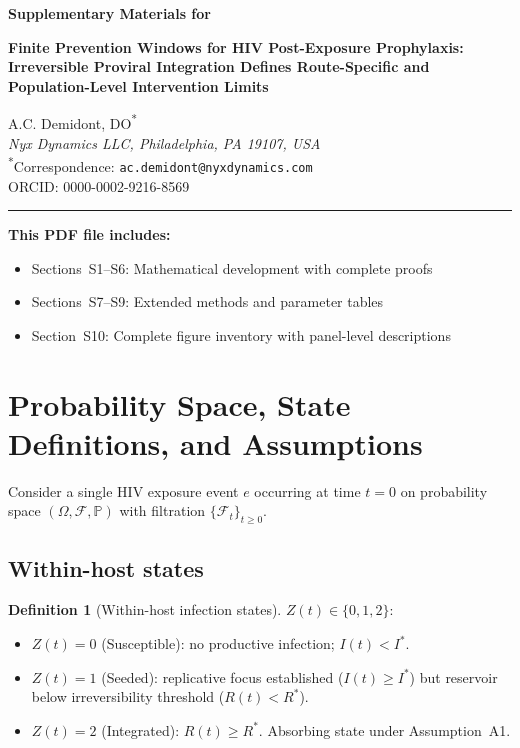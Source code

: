 \documentclass[11pt]{article}
\theoremstyle{definition}
\newtheorem{definition}{Definition}[section]
\theoremstyle{remark}
\begin{document}
\begin{flushleft}
{\Large\bfseries Supplementary Materials for\par}
\vspace{0.3em}
{\large\bfseries Finite Prevention Windows for HIV Post-Exposure Prophylaxis: Irreversible Proviral Integration Defines Route-Specific and Population-Level Intervention Limits\par}
\vspace{0.8em}
A.C. Demidont, DO\textsuperscript{*}\\
\textit{Nyx Dynamics LLC, Philadelphia, PA 19107, USA}\\
\textsuperscript{*}Correspondence: \texttt{ac.demidont@nyxdynamics.com}\\
ORCID: 0000-0002-9216-8569
\end{flushleft}

\vspace{0.5em}
\hrule
\vspace{0.5em}

\noindent\textbf{This PDF file includes:}
\begin{itemize}[leftmargin=2em,nosep]
    \item Sections~S1--S6: Mathematical development with complete proofs
    \item Sections~S7--S9: Extended methods and parameter tables
    \item Section~S10: Complete figure inventory with panel-level descriptions
\end{itemize}

\section{Probability Space, State Definitions, and Assumptions}

Consider a single HIV exposure event $e$ occurring at time $t = 0$ on probability space $(\Omega, \mathcal{F}, \mathbb{P})$ with filtration $\{\mathcal{F}_{t}\}_{t \geq 0}$.

\subsection{Within-host states}

\begin{definition}[Within-host infection states]
$Z(t) \in \{0, 1, 2\}$:
\begin{itemize}[nosep,leftmargin=2em]
    \item $Z(t) = 0$ (Susceptible): no productive infection; $I(t) < I^{*}$.
    \item $Z(t) = 1$ (Seeded): replicative focus established ($I(t) \geq I^{*}$) but reservoir below irreversibility threshold ($R(t) < R^{*}$).
    \item $Z(t) = 2$ (Integrated): $R(t) \geq R^{*}$. Absorbing state under Assumption~A1.
\end{itemize}
\end{definition}
\end{document}
